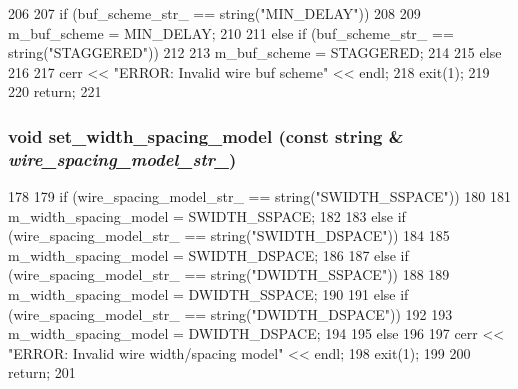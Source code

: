 \begin{DoxyCode}
206 {
207     if (buf_scheme_str_ == string("MIN_DELAY"))
208     {
209         m_buf_scheme = MIN_DELAY;
210     }
211     else if (buf_scheme_str_ == string("STAGGERED"))
212     {
213         m_buf_scheme = STAGGERED;
214     }
215     else
216     {
217         cerr << "ERROR: Invalid wire buf scheme" << endl;
218         exit(1);
219     }
220     return;
221 }
\end{DoxyCode}
\hypertarget{classWire_a0355236c41e8ee47a25e1d9b472efd6f}{
\subsubsection[{set\_\-width\_\-spacing\_\-model}]{\setlength{\rightskip}{0pt plus 5cm}void set\_\-width\_\-spacing\_\-model (const string \& {\em wire\_\-spacing\_\-model\_\-str\_\-})}}
\label{classWire_a0355236c41e8ee47a25e1d9b472efd6f}



\begin{DoxyCode}
178 {
179     if (wire_spacing_model_str_ == string("SWIDTH_SSPACE"))
180     {
181         m_width_spacing_model = SWIDTH_SSPACE;
182     }
183     else if (wire_spacing_model_str_ == string("SWIDTH_DSPACE"))
184     {
185         m_width_spacing_model = SWIDTH_DSPACE;
186     }
187     else if (wire_spacing_model_str_ == string("DWIDTH_SSPACE"))
188     {
189         m_width_spacing_model = DWIDTH_SSPACE;
190     }
191     else if (wire_spacing_model_str_ == string("DWIDTH_DSPACE"))
192     {
193         m_width_spacing_model = DWIDTH_DSPACE;
194     }
195     else
196     {
197         cerr << "ERROR: Invalid wire width/spacing model" << endl;
198         exit(1);
199     }
200     return;
201 }
\end{DoxyCode}


